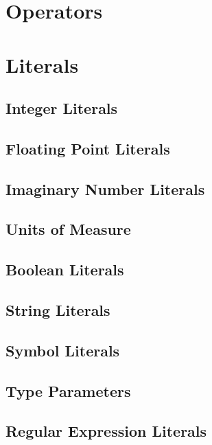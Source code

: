 \section{Operators}\label{sec:operators}

\section{Literals}\label{sec:literals}

\subsection{Integer Literals}\label{sec:integerliterals}

\subsection{Floating Point Literals}\label{sec:floatliterals}

\subsection{Imaginary Number Literals}\label{sec:imaginaryliterals}

\subsection{Units of Measure}

\subsection{Boolean Literals}\label{sec:booleanliterals}

\subsection{String Literals}\label{sec:stringliterals}

\subsection{Symbol Literals}\label{sec:symbolliterals}

\subsection{Type Parameters}\label{sec:typeparameterliterals}

\subsection{Regular Expression Literals}\label{sec:regexpliterals}

